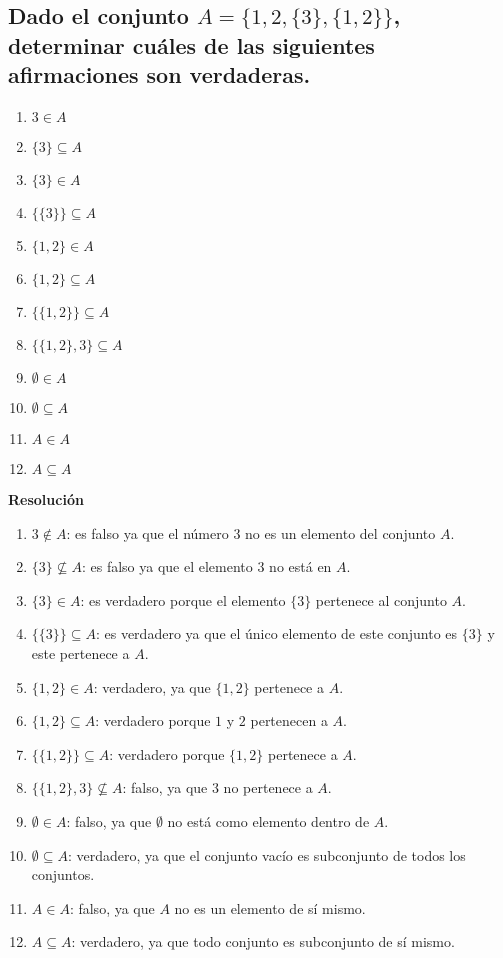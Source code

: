 \documentclass{article}
\begin{document}
\subsection{Dado el conjunto \texorpdfstring{$A = \{1, 2, \{3\}, \{1,2\}\}$}{A = {1, 2, {3}, {1,2}}}, determinar cuáles de las siguientes afirmaciones son verdaderas.}

\begin{multicols}{2}
\begin{enumerate}[label=\roman*)]
    \item $3 \in A$
    \item $\{3\} \subseteq A$
    \item $\{3\} \in A$
    \item $\{\{3\}\} \subseteq A$
    \item $\{1,2\} \in A$
    \item $\{1,2\} \subseteq A$
    \item $\{\{1,2\}\} \subseteq A$
    \item $\{\{1,2\}, 3\} \subseteq A$
    \item $\emptyset \in A$
    \item $\emptyset \subseteq A$
    \item $A \in A$
    \item $A \subseteq A$
\end{enumerate}
\end{multicols}

\textbf{Resolución}
\begin{enumerate}[label=\roman*)]
    \item $3 \notin A$: es falso ya que el número $3$ no es un elemento del conjunto $A$.
    \item $\{3\} \not\subseteq A$: es falso ya que el elemento $3$ no está en $A$.
    \item $\{3\} \in A$: es verdadero porque el elemento $\{3\}$ pertenece al conjunto $A$.
    \item $\{\{3\}\} \subseteq A$: es verdadero ya que el único elemento de este conjunto es $\{3\}$ y este pertenece a $A$. 
    \item $\{1,2\} \in A$: verdadero, ya que $\{1,2\}$ pertenece a $A$.
    \item $\{1,2\} \subseteq A$: verdadero porque $1$ y $2$ pertenecen a $A$. 
    \item $\{\{1,2\}\} \subseteq A$: verdadero porque $\{1,2\}$ pertenece a $A$. 
    \item $\{\{1,2\},3\} \not\subseteq A$: falso, ya que $3$ no pertenece a $A$. 
    \item $\emptyset \in A$: falso, ya que $\emptyset$ no está como elemento dentro de $A$.
    \item $\emptyset \subseteq A$: verdadero, ya que el conjunto vacío es subconjunto de todos los conjuntos. 
    \item $A \in A$: falso, ya que $A$ no es un elemento de sí mismo.
    \item $A \subseteq A$: verdadero, ya que todo conjunto es subconjunto de sí mismo.
\end{enumerate}
\end{document}
